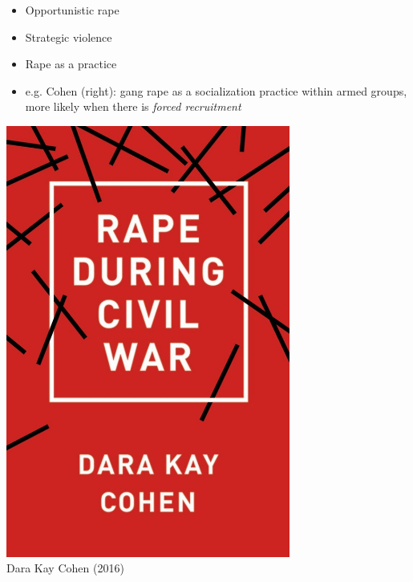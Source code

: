 \documentclass[utf8, xcolor=dvipsnames, handout]{beamer}
\begin{document}
\begin{frame}
\begin{minipage}{0.65\textwidth}\centering
  \begin{itemize}[<+->]
    \item<2->[1.] Opportunistic rape
    \item<3->[2.] Strategic violence
    \item<4->[3.] Rape as a practice
    \item<5-> e.g. Cohen (right): gang rape as a socialization practice within armed groups, more likely when there is \textit{forced recruitment}
  \end{itemize}
\end{minipage}\hfill
\begin{minipage}{0.34\textwidth}\centering
\includegraphics[width = 0.7\textwidth]{img/cohen_rape}\\Dara Kay Cohen (2016)
\end{minipage}

\end{frame}
\end{document}
